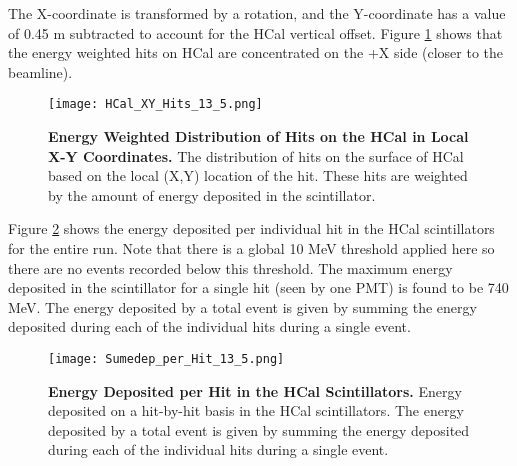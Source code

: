 \documentclass[10pt]{article}
\begin{document}
	\noindent The X-coordinate is transformed by a rotation, and the Y-coordinate has a value of 0.45 m subtracted to account for the HCal vertical offset. Figure \ref{fig:xy_hits} shows that the energy weighted hits on HCal are concentrated on the +X side (closer to the beamline).  
	\vspace{3mm}
	
	\begin{figure}[!ht]
	\begin{center}
	\texttt{[image: HCal\_XY\_Hits\_13\_5.png]}
	\end{center}
	\caption{
	{\bf{Energy Weighted Distribution of Hits on the HCal in Local X-Y Coordinates.}} The distribution of hits on the surface of HCal based on the local (X,Y) location of the hit. These hits are weighted by the amount of energy deposited in the scintillator.}
	\label{fig:xy_hits}
	\end{figure}	
	
	Figure \ref{fig:sumedep} shows the energy deposited per individual hit in the HCal scintillators for the entire run. Note that there is a global 10 MeV threshold applied here so there are no events recorded below this threshold. The maximum energy deposited in the scintillator for a single hit (seen by one PMT) is found to be 740 MeV. The energy deposited by a total event is given by summing the energy deposited during each of the individual hits during a single event.
	\vspace{3mm}
	
	\begin{figure}[!ht]
	\begin{center}
	\texttt{[image: Sumedep\_per\_Hit\_13\_5.png]}
	\end{center}
	\caption{
	{\bf{Energy Deposited per Hit in the HCal Scintillators.}} Energy deposited on a hit-by-hit basis in the HCal scintillators. The energy deposited by a total event is given by summing the energy deposited during each of the individual hits during a single event.}
	\label{fig:sumedep}
	\end{figure}	
\end{document}
